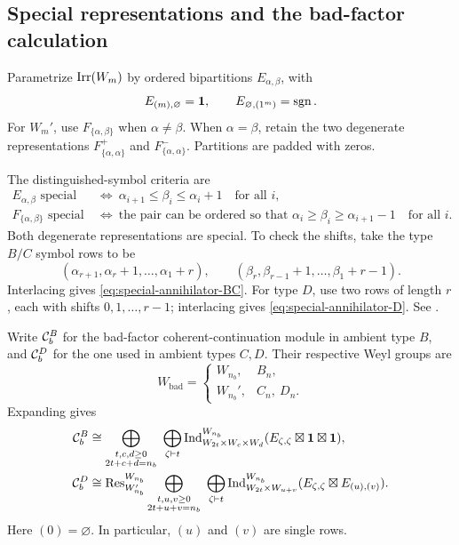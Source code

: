 \subsection{Special representations and the bad-factor calculation}

Parametrize $\operatorname{Irr}(W_m)$ by ordered bipartitions $E_{\alpha,\beta}$, with
\[
  E_{(m),\varnothing}=\mathbf1,\qquad
  E_{\varnothing,(1^m)}=\operatorname{sgn}.
\]
For $W_m'$, use $F_{\{\alpha,\beta\}}$ when $\alpha\ne\beta$.
When $\alpha=\beta$, retain the two degenerate representations
$F_{\{\alpha,\alpha\}}^+$ and $F_{\{\alpha,\alpha\}}^-$.
Partitions are padded with zeros.

The distinguished-symbol criteria are
\begin{align}
  E_{\alpha,\beta}\text{ special}
  &\ \Longleftrightarrow\
     \alpha_{i+1}\leq\beta_i\leq\alpha_i+1
     \quad\text{for all }i, \label{eq:special-annihilator-BC}\\
  F_{\{\alpha,\beta\}}\text{ special}
  &\ \Longleftrightarrow\
     \text{the pair can be ordered so that }
     \alpha_i\geq\beta_i\geq\alpha_{i+1}-1
     \quad\text{for all }i. \label{eq:special-annihilator-D}
\end{align}
Both degenerate representations are special. To check the shifts,
take the type $B/C$ symbol rows to be
\[
  (\alpha_{r+1},\alpha_r+1,\ldots,\alpha_1+r),\qquad
  (\beta_r,\beta_{r-1}+1,\ldots,\beta_1+r-1).
\]
Interlacing gives \eqref{eq:special-annihilator-BC}.
For type $D$, use two rows of length $r$, each with shifts
$0,1,\ldots,r-1$; interlacing gives
\eqref{eq:special-annihilator-D}. See \cite[\S4.3]{BMW2024}.

Write $\mathcal{C}_b^B$ for the bad-factor coherent-continuation module in
ambient type $B$, and $\mathcal{C}_b^D$ for the one used in ambient types $C,D$.
Their respective Weyl groups are
\[
  W_{\mathrm{bad}}=
  \begin{cases}
    W_{n_b},&B_n,\\
    W_{n_b}',&C_n,\ D_n.
  \end{cases}
\]
Expanding \cite[Prop.~8.1 and (8.16)]{BMSZ22} gives
\begin{align}
  \mathcal{C}_b^B
  &\cong
    \bigoplus_{\substack{t,c,d\geq0\\2t+c+d=n_b}}
    \ \bigoplus_{\zeta\vdash t}
    \operatorname{Ind}_{W_{2t}\times W_c\times W_d}^{W_{n_b}}
       (E_{\zeta,\zeta}\boxtimes\mathbf1\boxtimes\mathbf1),
       \label{eq:special-annihilator-bad-B}\\
  \mathcal{C}_b^D
  &\cong
    \operatorname{Res}_{W_{n_b}'}^{W_{n_b}}
    \bigoplus_{\substack{t,u,v\geq0\\2t+u+v=n_b}}
    \ \bigoplus_{\zeta\vdash t}
    \operatorname{Ind}_{W_{2t}\times W_{u+v}}^{W_{n_b}}
       (E_{\zeta,\zeta}\boxtimes E_{(u),(v)}).
       \label{eq:special-annihilator-bad-D}
\end{align}
Here $(0)=\varnothing$. In particular, $(u)$ and $(v)$ are single rows.


